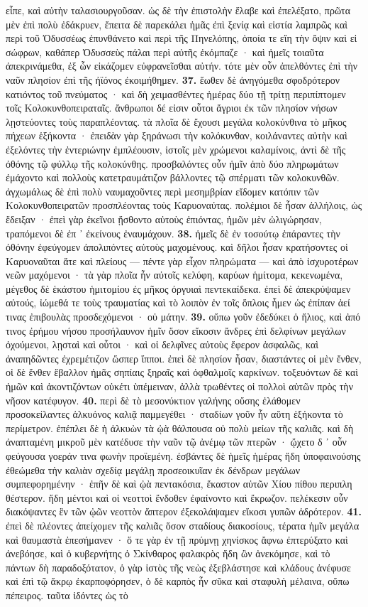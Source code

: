 \documentclass[a4paper, 11pt, oneside, polutonikogreek, german]{article}
\begin{document}
εἶπε, καὶ αὐτὴν ταλασιουργοῦσαν. ὡς δὲ τὴν ἐπιστολὴν ἔλαβε καὶ ἐπελέξατο, πρῶτα μὲν ἐπὶ πολὺ ἐδάκρυεν, ἔπειτα δὲ παρεκάλει ἡμᾶς ἐπὶ ξενίᾳ καὶ εἱστία λαμπρῶς καὶ περὶ τοῦ Ὀδυσσέως ἐπυνθάνετο καὶ περὶ τῆς Πηνελόπης, ὁποία τε εἴη τὴν ὄψιν καὶ εἰ σώφρων, καθάπερ Ὀδυσσεὺς πάλαι περὶ αὐτῆς ἐκόμπαζε · καὶ ἡμεῖς τοιαῦτα ἀπεκρινάμεθα, ἐξ ὧν εἰκάζομεν εὐφρανεῖσθαι αὐτήν. τότε μὲν οὖν ἀπελθόντες ἐπὶ τὴν ναῦν πλησίον ἐπὶ τῆς ἠϊόνος ἐκοιμήθημεν. \textbf{37.} ἕωθεν δὲ ἀνηγόμεθα σφοδρότερον κατιόντος τοῦ πνεύματος · καὶ δὴ χειμασθέντες ἡμέρας δύο τῇ τρίτῃ περιπίπτομεν τοῖς Κολοκυνθοπειραταῖς. ἄνθρωποι δέ εἰσιν οὗτοι ἄγριοι ἐκ τῶν πλησίον νήσων λῃστεύοντες τοὺς παραπλέοντας. τὰ πλοῖα δὲ ἔχουσι μεγάλα κολοκύνθινα τὸ μῆκος πήχεων ἑξήκοντα · ἐπειδὰν γὰρ ξηράνωσι τὴν κολόκυνθαν, κοιλάναντες αὐτὴν καὶ ἐξελόντες τὴν ἐντεριώνην ἐμπλέουσιν, ἱστοῖς μὲν χρώμενοι καλαμίνοις, ἀντὶ δὲ τῆς ὀθόνης τῷ φύλλῳ τῆς κολοκύνθης. προσβαλόντες οὖν ἡμῖν ἀπὸ δύο πληρωμάτων ἐμάχοντο καὶ πολλοὺς κατετραυμάτιζον βάλλοντες τῷ σπέρματι τῶν κολοκυνθῶν. ἀγχωμάλως δὲ ἐπὶ πολὺ ναυμαχοῦντες περὶ μεσημβρίαν εἴδομεν κατόπιν τῶν Κολοκυνθοπειρατῶν προσπλέοντας τοὺς Καρυοναύτας. πολέμιοι δὲ ἦσαν ἀλλήλοις, ὡς ἔδειξαν · ἐπεὶ γὰρ ἐκεῖνοι ᾔσθοντο αὐτοὺς ἐπιόντας, ἡμῶν μὲν ὠλιγώρησαν, τραπόμενοι δὲ ἐπ ᾽ ἐκείνους ἐναυμάχουν. \textbf{38.} ἡμεῖς δὲ ἐν τοσούτῳ ἐπάραντες τὴν ὀθόνην ἐφεύγομεν ἀπολιπόντες αὐτοὺς μαχομένους. καὶ δῆλοι ἦσαν κρατήσοντες οἱ Καρυοναῦται ἅτε καὶ πλείους --- πέντε γὰρ εἶχον πληρώματα --- καὶ ἀπὸ ἰσχυροτέρων νεῶν μαχόμενοι · τὰ γὰρ πλοῖα ἦν αὐτοῖς κελύφη, καρύων ἡμίτομα, κεκενωμένα, μέγεθος δὲ ἑκάστου ἡμιτομίου ἐς μῆκος ὀργυιαὶ πεντεκαίδεκα. ἐπεὶ δὲ ἀπεκρύψαμεν αὐτούς, ἰώμεθά τε τοὺς τραυματίας καὶ τὸ λοιπὸν ἐν τοῖς ὅπλοις ἦμεν ὡς ἐπίπαν ἀεί τινας ἐπιβουλὰς προσδεχόμενοι · οὐ μάτην. \textbf{39.} οὔπω γοῦν ἐδεδύκει ὁ ἥλιος, καὶ ἀπό τινος ἐρήμου νήσου προσήλαυνον ἡμῖν ὅσον εἴκοσιν ἄνδρες ἐπὶ δελφίνων μεγάλων ὀχούμενοι, λῃσταὶ καὶ οὗτοι · καὶ οἱ δελφῖνες αὐτοὺς ἔφερον ἀσφαλῶς, καὶ ἀναπηδῶντες ἐχρεμέτιζον ὥσπερ ἵπποι. ἐπεὶ δὲ πλησίον ἦσαν, διαστάντες οἱ μὲν ἔνθεν, οἱ δὲ ἔνθεν ἔβαλλον ἡμᾶς σηπίαις ξηραῖς καὶ ὀφθαλμοῖς καρκίνων. τοξευόντων δὲ καὶ ἡμῶν καὶ ἀκοντιζόντων οὐκέτι ὑπέμειναν, ἀλλὰ τρωθέντες οἱ πολλοὶ αὐτῶν πρὸς τὴν νῆσον κατέφυγον. \textbf{40.} περὶ δὲ τὸ μεσονύκτιον γαλήνης οὔσης ἐλάθομεν προσοκείλαντες ἀλκυόνος καλιᾷ παμμεγέθει · σταδίων γοῦν ἦν αὕτη ἑξήκοντα τὸ περίμετρον. ἐπέπλει δὲ ἡ ἀλκυὼν τὰ ᾠὰ θάλπουσα οὐ πολὺ μείων τῆς καλιᾶς. καὶ δὴ ἀναπταμένη μικροῦ μὲν κατέδυσε τὴν ναῦν τῷ ἀνέμῳ τῶν πτερῶν · ᾤχετο δ ᾽ οὖν φεύγουσα γοεράν τινα φωνὴν προϊεμένη. ἐσβάντες δὲ ἡμεῖς ἡμέρας ἤδη ὑποφαινούσης ἐθεώμεθα τὴν καλιὰν σχεδίᾳ μεγάλῃ προσεοικυῖαν ἐκ δένδρων μεγάλων συμπεφορημένην · ἐπῆν δὲ καὶ ᾠὰ πεντακόσια, ἕκαστον αὐτῶν Χίου πίθου περιπλη θέστερον. ἤδη μέντοι καὶ οἱ νεοττοὶ ἔνδοθεν ἐφαίνοντο καὶ ἔκρωζον. πελέκεσιν οὖν διακόψαντες ἓν τῶν ᾠῶν νεοττὸν ἄπτερον ἐξεκολάψαμεν εἴκοσι γυπῶν ἁδρότερον. \textbf{41.} ἐπεὶ δὲ πλέοντες ἀπείχομεν τῆς καλιᾶς ὅσον σταδίους διακοσίους, τέρατα ἡμῖν μεγάλα καὶ θαυμαστὰ ἐπεσήμανεν · ὅ τε γὰρ ἐν τῇ πρύμνῃ χηνίσκος ἄφνω ἐπτερύξατο καὶ ἀνεβόησε, καὶ ὁ κυβερνήτης ὁ Σκίνθαρος φαλακρὸς ἤδη ὢν ἀνεκόμησε, καὶ τὸ πάντων δὴ παραδοξότατον, ὁ γὰρ ἱστὸς τῆς νεὼς ἐξεβλάστησε καὶ κλάδους ἀνέφυσε καὶ ἐπὶ τῷ ἄκρῳ ἐκαρποφόρησεν, ὁ δὲ καρπὸς ἦν σῦκα καὶ σταφυλὴ μέλαινα, οὔπω πέπειρος. ταῦτα ἰδόντες ὡς τὸ 
\end{document}
